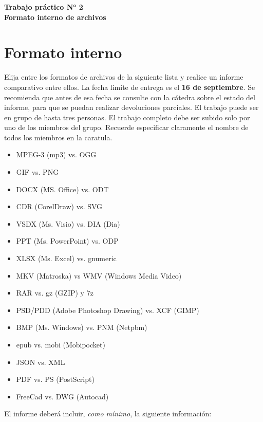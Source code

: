 \documentclass[12pt]{article}
\def\maketitle{

\makeatletter
{\color{bl} \centering \huge \sc \textbf{
Trabajo práctico N° 2\\
\large \vspace*{-8pt} \color{black} Formato interno de archivos
\vspace*{8pt} }\par}
\makeatother

\makeatletter


}
\begin{document}
\thispagestyle{empty}
\maketitle
\setlength{\parindent}{0pt}

\section*{Formato interno}

Elija entre los formatos de archivos de la siguiente lista y realice un
informe comparativo entre ellos. La fecha limite de entrega es el \textbf{16
de septiembre}. Se recomienda que antes de esa fecha se consulte con la
cátedra sobre el estado del informe, para que se puedan realizar devoluciones
parciales. El trabajo puede ser en grupo de hasta tres personas. El trabajo
completo debe ser subido solo por uno de los miembros del grupo. Recuerde
especificar claramente el nombre de todos los miembros en la caratula.

\begin{itemize}
    \itemsep2pt \parskip0pt 
    \item MPEG-3 (mp3) vs. OGG
    \item GIF vs. PNG
    \item DOCX (MS. Office) vs. ODT
    \item CDR (CorelDraw) vs. SVG
    \item VSDX (Ms. Visio) vs. DIA (Dia)
    \item PPT (Ms. PowerPoint) vs. ODP
    \item XLSX (Ms. Excel) vs. gnumeric
    \item MKV (Matroska) vs WMV (Windows Media Video)
    \item RAR vs. gz (GZIP) y 7z
    \item PSD/PDD (Adobe Photoshop Drawing) vs. XCF (GIMP)
    \item BMP (Ms. Windows) vs. PNM (Netpbm)
    \item epub vs. mobi (Mobipocket)
    \item JSON vs. XML
    \item PDF vs. PS (PostScript)
    \item FreeCad vs. DWG (Autocad)
\end{itemize}

El informe deberá incluir, {\it como mínimo}, la siguiente información:
\end{document}
